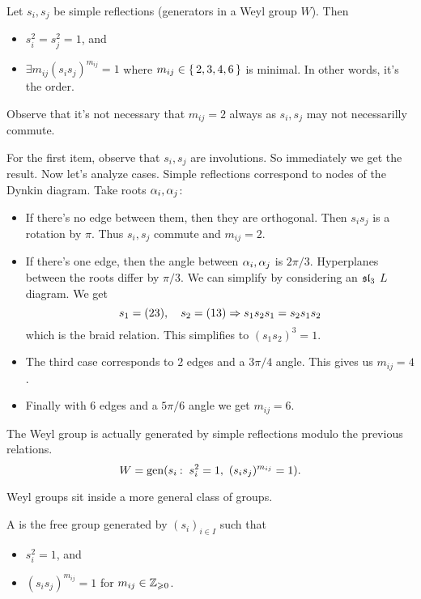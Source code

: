 \documentclass[12pt]{memoir}
\begin{document}
\begin{Prop}
    Let $s_i,s_j$ be simple reflections (generators in a Weyl group $W$). Then 
    \begin{itemize}
        \item $s_i^2=s_j^2=1$, and
        \item $\exists m_{ij}(s_is_j)^{m_{ij}}=1$ where $m_{ij}\in\{\,2,3,4,6\,\}$ is minimal. In other words, it's the order.
    \end{itemize}
\end{Prop}

Observe that it's not necessary that $m_{ij}=2$ always as $s_i,s_j$ may not necessarilly commute.

\begin{ptcbp}
    For the first item, observe that $s_i,s_j$ are involutions. So immediately we get the result. Now let's analyze cases. Simple reflections correspond to nodes of the Dynkin diagram. Take roots $\alpha_i,\alpha_j$:
    \begin{itemize}
        \item If there's no edge between them, then they are orthogonal. Then $s_is_j$ is a rotation by $\pi$. Thus $s_i,s_j$ commute and $m_{ij}=2$.
        \item If there's one edge, then the angle between $\alpha_i,\alpha_j$ is $2\pi/3$. Hyperplanes between the roots differ by $\pi/3$. We can simplify by considering an $\mathfrak{sl}_3$ $L$ diagram. We get 
        $$s_1=(23),\quad s_2=(13)\Rightarrow s_1s_2s_1=s_2s_1s_2$$
        which is the braid relation. This simplifies to $(s_1s_2)^3=1$.
        \item The third case corresponds to $2$ edges and a $3\pi/4$ angle. This gives us $m_{ij}=4$.
        \item  Finally with $6$ edges and a $5\pi/6$ angle we get $m_{ij}=6$.
    \end{itemize}
\end{ptcbp}

\begin{Th}
    The Weyl group is actually generated by simple reflections modulo the previous relations.
    $$W=\gen(s_i\:\ s_i^2=1,\ (s_is_j)^{m_{ij}}=1).$$
\end{Th}

Weyl groups sit inside a more general class of groups.

\begin{Def}
    A  is the free group generated by $(s_i)_{i\in I}$ such that 
    \begin{itemize}
        \item $s_i^2=1$, and
        \item $(s_is_j)^{m_{ij}}=1$ for $m_{ij}\in\mathbb{Z}_{\geqslant 0}$.
    \end{itemize}
\end{Def}
\end{document}

